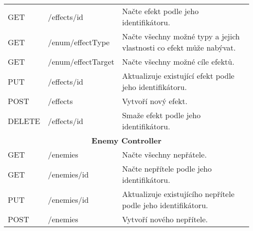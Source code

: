 \begin{longtable}{|l|l|p{}|}
    GET             & /effects/{id}                          & Načte efekt podle jeho identifikátoru.                                                                                                     \\
    GET             & /enum/effectType                       & Načte všechny možné typy a jejich vlastnosti co efekt může nabývat.                                                                        \\
    GET             & /enum/effectTarget                     & Načte všechny možné cíle efektů.                                                                                                           \\
    PUT             & /effects/{id}                          & Aktualizuje existující efekt podle jeho identifikátoru.                                                                                    \\
    POST            & /effects                               & Vytvoří nový efekt.                                                                                                                        \\
    DELETE          & /effects/{id}                          & Smaže efekt podle jeho identifikátoru.                                                                                                     \\
    \hline
    \multicolumn{3}{|c|}{\textbf{Enemy Controller}}                                                                                                                                                       \\
    \hline
    GET             & /enemies                               & Načte všechny nepřátele.                                                                                                                   \\
    GET             & /enemies/{id}                          & Načte nepřítele podle jeho identifikátoru.                                                                                                 \\
    PUT             & /enemies/{id}                          & Aktualizuje existujícího nepřítele podle jeho identifikátoru.                                                                              \\
    POST            & /enemies                               & Vytvoří nového nepřítele.                                                                                                                  \\

\end{longtable}
